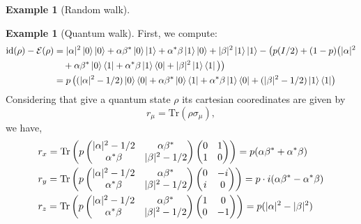 \documentclass[10pt,a4paper]{amsart}
\theoremstyle{definition}
\theoremstyle{definition}
\newtheorem{example}[definition]{Example}
\theoremstyle{definition}
\theoremstyle{definition}
\theoremstyle{definition}
\theoremstyle{definition}
\begin{document}
\begin{example}[Random walk]
\begin{example} [Quantum walk]
First, we compute:
\begin{align*}
\mathrm{id} (\rho) - \mathcal{E}(\rho) &=    |\alpha|^{2} \ket{0} \ket{0} + \alpha \beta^{*} \ket{0} \ket{1} + \alpha^{*} \beta \ket{1} \ket{0} + |\beta|^{2} \ket{1} \ket{1}  - \big( p(I/ 2) + (1-p) \big(|\alpha|^{2}  \\ 
  & \hspace{10pt}  +  \alpha \beta^{*} \ket{0}\bra{1} +  \alpha^{*} \beta \ket{1}\bra{0} + |\beta|^{2} \ket{1}\bra{1}\big)\big)\\
& = p \left( (|\alpha|^2-1/2) \ket{0}\bra{0} +  \alpha \beta^{*} \ket{0} \bra{1} + \alpha^{*} \beta \ket{1} \bra{0} + (|\beta|^{2} -1/2) \ket{1} \bra{1} \right)
\end{align*} 
Considering that give a quantum state $\rho$ its cartesian cooredinates are given by 
\begin{equation*}
  r_{\mu} = \text{Tr}(\rho \sigma_{\mu}),
\end{equation*} 
we have,
\begin{align*}
  & r_x = \text{Tr} \left( p \begin{pmatrix}
    |\alpha|^2-1/2 & \alpha \beta^{*} \\
    \alpha^{*} \beta & |\beta|^{2} -1/2
    \end{pmatrix}
     \begin{pmatrix}
   0 & 1 \\
   1 & 0
    \end{pmatrix}  \right)
    = p(\alpha \beta^{*} + \alpha^{*} \beta) \\
  & r_y = \text{Tr}\left(p\begin{pmatrix}
    |\alpha|^2-1/2 & \alpha \beta^{*} \\
    \alpha^{*} \beta & |\beta|^{2} -1/2
    \end{pmatrix}
     \begin{pmatrix}
   0 & -i \\
   i & 0
    \end{pmatrix} \right) 
    = p \cdot i(\alpha \beta^{*} - \alpha^{*} \beta) \\
     & r_z = \text{Tr} \left( p\begin{pmatrix}
    |\alpha|^2-1/2 & \alpha \beta^{*} \\
    \alpha^{*} \beta & |\beta|^{2} -1/2
    \end{pmatrix}
     \begin{pmatrix}
   1 & 0 \\
   0 & -1
    \end{pmatrix} \right) = p(|\alpha|^2-|\beta|^2 )
\end{align*}


\end{example}
\end{example}
\end{document}
